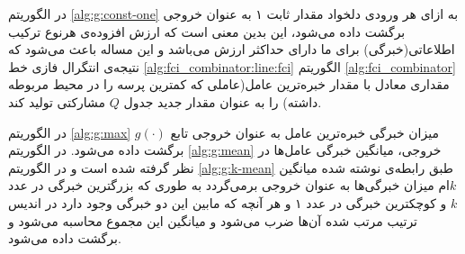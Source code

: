 در الگوریتم \ref{alg:g:const-one} به ازای هر ورودی دلخواد مقدار ثابت ۱ به عنوان خروجی برگشت داده می‌شود، این بدین معنی است که ارزش افزوده‌ی هرنوع ترکیب اطلاعاتی(خبرگی) برای ما دارای حداکثر ارزش می‌باشد و این مساله باعث می‌شود که نتیجه‌ی انتگرال فازی خط \ref{alg:fci_combinator:line:fci} الگوریتم \ref{alg:fci_combinator} مقداری معادل با مقدار خبره‌ترین عامل(عاملی که کمترین پرسه را در محیط مربوطه داشته) را به عنوان مقدار جدید جدول $Q$ مشارکتی تولید کند.

در الگوریتم \ref{alg:g:max} میزان خبرگی خبره‌ترین عامل به عنوان خروجی تابع $g(\cdot)$ برگشت داده می‌شود. در الگوریتم \ref{alg:g:mean} خروجی، میانگین خبرگی عامل‌ها در نظر گرفته شده است و در الگوریتم \ref{alg:g:k-mean} طبق رابطه‌ی نوشته شده میانگین $k$ام میزان خبرگی‌ها به عنوان خروجی برمی‌گردد به طوری که بزرگترین خبرگی در عدد $k$ و کوچکترین خبرگی در عدد ۱ و هر آنچه که مابین این دو خبرگی وجود دارد در اندیس ترتیب مرتب شده آن‌ها ضرب می‌شود و میانگین این مجموع محاسبه می‌شود و برگشت داده می‌شود.